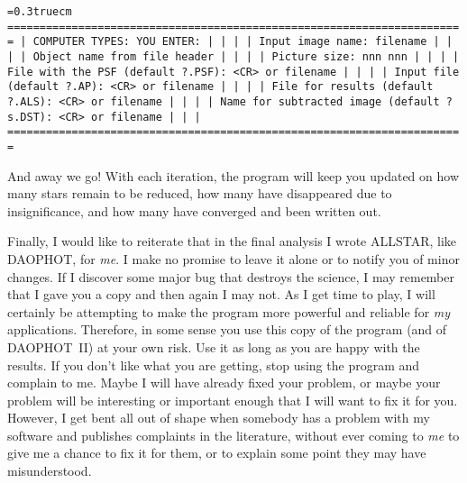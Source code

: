 \bigskip
{\noindent\obeylines\obeyspaces\frenchspacing\tt\baselineskip=0.3truecm
=======================================================================
| COMPUTER TYPES:                                  YOU ENTER:         |
|                                                                     |
|                              Input image name:   filename           |
|                                                                     |
|        Object name from file header                                 |
|                                                                     |
|                    Picture size: nnn nnn                            |
|                                                                     |
|             File with the PSF (default ?.PSF):   <CR> or filename   |
|                                                                     |
|                     Input file (default ?.AP):   <CR> or filename   |
|                                                                     |
|              File for results (default ?.ALS):   <CR> or filename   |
|                                                                     |
|    Name for subtracted image (default ?s.DST):   <CR> or filename   |
|                                                                     |
=======================================================================
} 
\bigskip 

And away we go!  With each iteration, the program will keep you updated
on how many stars remain to be reduced, how many have disappeared due
to insignificance, and how many have converged and been written out.

Finally, I would like to reiterate that in the final analysis I wrote
ALLSTAR, like DAOPHOT, for {\it me\/}.  I make no promise to
leave it alone or to notify you of minor changes.  If I discover some
major bug that destroys the science, I may remember that I gave you a
copy and then again I may not.  As I get time to play, I will certainly
be attempting to make the program more powerful and reliable for {\it
my\/} applications.   Therefore, in some sense you use this copy of the
program (and of DAOPHOT~II) at your own risk.  Use it as long as you
are happy with the results.  If you don't like what you are getting,
stop using the program and complain to me.  Maybe I will have already
fixed your problem, or maybe your problem will be interesting or
important enough that I will want to fix it for you.  However, I get
bent all out of shape when somebody has a problem with my software and
publishes complaints in the literature, without ever coming to {\it
me\/} to give me a chance to fix it for them, or to explain some point
they may have misunderstood.


